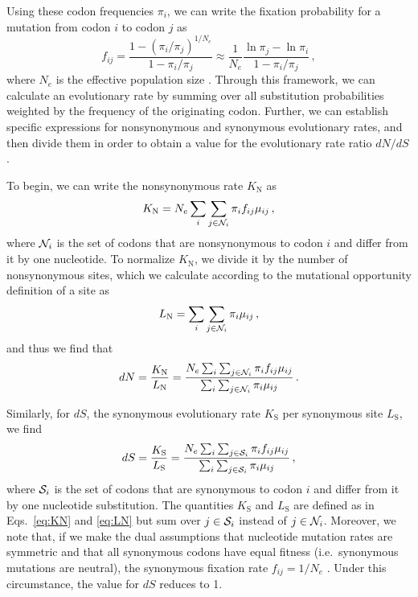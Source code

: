 \documentclass{pnastwo}
\begin{document}
\begin{article}
Using these codon frequencies $\pi_i$, we can write the fixation probability for a mutation from codon $i$ to codon $j$ as
\begin{equation}\label{eq:f_ij}
 f_{ij} = \frac{1-(\pi_i/\pi_j)^{1/N_e}}{1-\pi_i/\pi_j}
  \approx \frac{1}{N_e} \frac{\ln \pi_j - \ln \pi_i}{1-\pi_i/\pi_j}\,,
\end{equation}
where $N_e$ is the effective population size \cite{HalpernBruno1998,SellaHirsh2005}. Through this framework, we can calculate an evolutionary rate by summing over all substitution probabilities weighted by the frequency of the originating codon. Further, we can establish specific expressions for nonsynonymous and synonymous evolutionary rates, and then divide them in order to obtain a value for the evolutionary rate ratio $dN/dS$.

To begin, we can write the nonsynonymous rate $K_\text{N}$ as 
\begin{equation}\label{eq:KN}
  K_\text{N} = N_e \sum_i \sum_{j \in {\cal N}_i} \pi_i  f_{ij}\mu_{ij}\,,
\end{equation}
where ${\cal N}_i$ is the set of codons that are nonsynonymous to codon $i$ and differ from it by one nucleotide. To normalize $K_\text{N}$, we divide it by the number of nonsynonymous sites, which we calculate according to the mutational opportunity definition of a site \cite{GoldmanYang1994, Yang2006} as 
\begin{equation}\label{eq:LN}
  L_\text{N} = \sum_i \sum_{j \in {\cal N}_i} \pi_i \mu_{ij}\,, 
\end{equation} and thus we find that 
\begin{equation}\label{eq:dN}
  dN = \frac{K_\text{N}}{L_\text{N}}=\frac{ N_e \sum_i \sum_{j \in {\cal N}_i} \pi_i f_{ij} \mu_{ij} } {\sum_i \sum_{j \in {\cal N}_i} \pi_i \mu_{ij} }\,.
\end{equation}

Similarly, for $dS$, the synonymous evolutionary rate $K_\text{S}$ per synonymous site $L_\text{S}$, we find
\begin{equation}\label{eq:dS}
  dS = \frac{K_\text{S}}{L_\text{S}}=\frac{ N_e \sum_i \sum_{j \in {\cal S}_i} \pi_i f_{ij} \mu_{ij} } {\sum_i \sum_{j \in {\cal S}_i} \pi_i \mu_{ij} }\,,
\end{equation}
where ${\cal S}_i$ is the set of codons that are synonymous to codon $i$ and differ from it by one nucleotide substitution. The quantities $K_\text{S}$ and $L_\text{S}$ are defined as in Eqs.~\eqref{eq:KN} and \eqref{eq:LN} but sum over $j\in {\cal S}_i$ instead of $j\in {\cal N}_i$. Moreover, we note that, if we make the dual assumptions that nucleotide mutation rates are symmetric and that all synonymous codons have equal fitness (i.e.\ synonymous mutations are neutral), the synonymous fixation rate $f_{ij}= 1/N_e$ \cite{CrowKimura1970}. Under this circumstance, the value for $dS$ reduces to 1.



\end{article}
\end{document}
